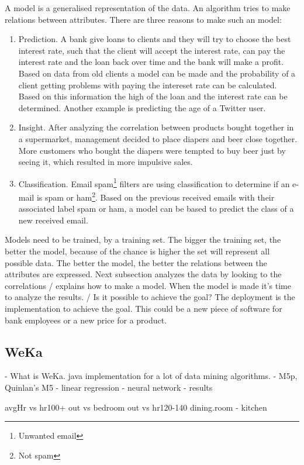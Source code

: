 	A model is a generalised representation of the data. An algorithm tries to make relations between attributes. There are three reasons to make such an model:
	\begin{enumerate}
		\item Prediction. A bank give loans to clients and they will try to choose the best interest rate, such that the client will accept the interest rate, can pay the interest rate and the loan back over time and the bank will make a profit. Based on data from old clients a model can be made and the probability of a client getting problems with paying the intereset rate can be calculated. Based on this information the high of the loan and the interest rate can be determined.\cite{credit} Another example is predicting the age of a Twitter user\cite{tweetgenie}.		
		\item Insight. After analyzing the correlation between products bought together in a supermarket, management decided to place diapers and beer close together. More customers who bought the diapers were tempted to buy beer just by seeing it, which resulted in more impulsive sales\cite{beer}.
		\item Classification. Email spam\footnote{Unwanted email} filters are using classification to determine if an e-mail is spam or ham\footnote{Not spam}. Based on the previous received emails with their associated label spam or ham, a model can be based to predict the class of a new received email. 
	\end{enumerate}
	Models need to be trained, by a training set. The bigger the training set, the better the model, because of the chance is higher the set will represent all possible data. The better the model, the better the relations between the attributes are expressed. Next subsection analyzes the data by looking to the correlations / explains how to make a model. When the model is made it's time to analyze the results. / Is it possible to achieve the goal? The deployment is the implementation to achieve the goal. This could be a new piece of software for bank employees or a new price for a product. 

	\subsection{WeKa}
	- What is WeKa. java implementation for a lot of data mining algorithms.
	- M5p, Quinlan's M5
	- linear regression
	- neural network
	- results 

	avgHr vs hr100+
	out vs bedroom
	out vs hr120-140
	dining.room - kitchen

